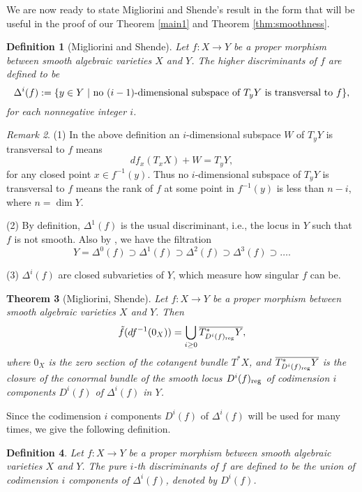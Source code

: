 \documentclass[a4paper,12pt,reqno]{amsart}
\newtheorem{theorem}{Theorem}[section]
\theoremstyle{plain}
\newtheorem{definition}[theorem]{Definition}
\theoremstyle{remark}
\newtheorem{remark}[theorem]{Remark}
\begin{document}
We are now ready to state Migliorini and Shende's
result \cite{MiSh} in the form that will be useful in the proof of our Theorem \ref{main1} and Theorem \ref{thm:smoothness}.

\begin{definition}[Migliorini and Shende]\label{def:higherdiscriminants}
Let $f: X\to Y$ be a proper morphism between smooth algebraic  varieties $X$ and $Y$. The higher discriminants of $f $ are defined to be
$$\Delta^i(f):=\{ y\in Y\ |\ \textnormal{no}\ (i-1)\textnormal{-dimensional subspace of}\  T_yY \ \textnormal{is transversal to} \ f \},$$ for each nonnegative integer $i$.
\end{definition}

\begin{remark}
(1) In the above definition an $i$-dimensional subspace $W$ of $T_yY$ is transversal to $f$ means $$df_x(T_xX)+W=T_yY,$$ for any closed point $x\in f^{-1}(y)$. Thus no $i$-dimensional subspace of $T_yY$ is transversal to $f$ means the rank of $f$ at some point in $f^{-1}(y)$ is less than $n-i$, where $n=\dim Y$.

(2) By definition, $\Delta^1(f)$ is the usual discriminant, i.e., the locus in $Y$ such that $f$ is not smooth. Also by \cite[Proposition 10.6]{Har77}, we have the filtration  $$Y=\Delta^0(f)\supset \Delta^1(f)\supset\Delta^2(f)\supset\Delta^3(f)\supset\ldots.$$

(3) $\Delta^i(f)$ are closed subvarieties of $Y$, which measure how singular $f$ can be.
\end{remark}



\begin{theorem}[Migliorini, Shende]\label{MiSh}
Let $f: X\to Y$ be a proper morphism between smooth algebraic varieties $X$ and $Y$. Then $$\tilde{f}(df^{-1}(0_X))=\bigcup_{i\geq0}\overline{T^*_{D^i(f)_{\textnormal{reg}}}Y},$$ where $0_X$ is the zero section of the cotangent bundle $T^*X$, and $\overline{T^*_{D^i(f)_{\textnormal{reg}}}Y}$ is the closure of the conormal bundle of the smooth locus $D^i(f)_{\textnormal{reg}}$ of codimension $i$ components  $D^i(f)$ of $\Delta^i(f)$ in $Y$.
\end{theorem}

Since the codimension $i$ components $D^i(f)$ of $\Delta^i(f)$ will be used for many times, we give the following definition.

\begin{definition}
Let $f: X\to Y$ be a proper morphism between smooth algebraic varieties $X$ and $Y$. The pure $i$-th discriminants of $f $ are defined to be
the union of codimension $i$ components of $\Delta^i(f)$, denoted by $D^i(f)$.
\end{definition}
\end{document}
